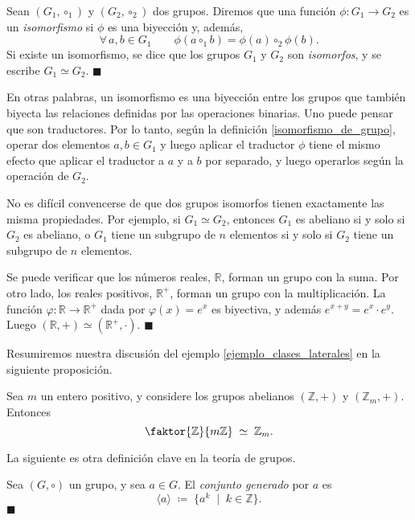 \begin{definition}[Isomorfismo] \label{isomorfismo_de_grupo}
Sean $(G_1, \circ_1)$ y $(G_2, \circ_2)$ dos grupos. Diremos que una función $\phi\colon G_1 \rightarrow G_2$ es un \emph{isomorfismo} si $\phi$ es una biyección y, además,
$$\forall\, a, b \in G_1 \qquad \phi(a \circ_1 b) = \phi(a) \circ_2 \phi(b).$$
Si existe un isomorfismo, se dice que los grupos $G_1$ y $G_2$ son \emph{isomorfos}, y se escribe $G_1 \simeq G_2$. \hfill$\blacksquare$
\end{definition}

En otras palabras, un isomorfismo es una biyección entre los grupos que también biyecta las relaciones definidas por las operaciones binarias. Uno puede pensar que son traductores. Por lo tanto, según la definición \ref{isomorfismo_de_grupo}, operar dos elementos $a, b \in G_1$ y luego aplicar el traductor $\phi$ tiene el mismo efecto que aplicar el traductor a $a$ y a $b$ por separado, y luego operarlos según la operación de $G_2$.

No es difícil convencerse de que dos grupos isomorfos tienen exactamente las misma propiedades. Por ejemplo, si $G_1 \simeq G_2$, entonces $G_1$ es abeliano si y solo si $G_2$ es abeliano, o $G_1$ tiene un subgrupo de $n$ elementos si y solo si $G_2$ tiene un subgrupo de $n$ elementos.


\begin{example} \label{ejemplo_exponencial}
Se puede verificar que los números reales, $\mathbb{R}$, forman un grupo con la suma. Por otro lado, los reales positivos, $\mathbb{R}^{+}$, forman un grupo con la multiplicación. La función $\varphi\colon \mathbb{R} \rightarrow \mathbb{R}^{+}$ dada por $\varphi(x) = e^x$ es biyectiva, y además $e^{x+y} = e^x \cdot e^y$. Luego $(\mathbb{R}, +) \simeq (\mathbb{R}^{+}, \cdot)$. \hfill$\blacksquare$
\end{example}

Resumiremos nuestra discusión del ejemplo \ref{ejemplo_clases_laterales} en la siguiente proposición.

\begin{prop}
Sea $m$ un entero positivo, y considere los grupos abelianos $(\mathbb{Z}, +)$ y $(\mathbb{Z}_m, +)$. Entonces $$\faktor{\mathbb{Z}}{m \mathbb{Z}} \; \simeq \; \mathbb{Z}_m.$$
\end{prop}


La siguiente es otra definición clave en la teoría de grupos.
 
\begin{definition}\label{def_gen}
	Sea $(G,\circ)$ un grupo, y sea $a \in G$.
	El \emph{conjunto generado} por $a$ es
	$$\langle a \rangle \; \coloneq \; \{a^k\; \mid \; k\in\mathbb{Z}\}.$$
    \hfill$\blacksquare$
\end{definition}

